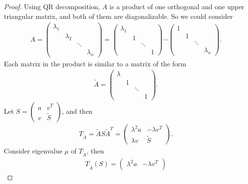 \documentclass[11pt]{book}
\theoremstyle{definition}
\numberwithin{equation}{chapter}
\begin{document}
\begin{proof}
Using QR decomposition, $A$ is a product of one orthogonal and one upper triangular matrix, and both of them are diagonalizable. So we could consider
\begin{align*}
    A = \begin{pmatrix}
        \lambda_1 & & & \\
        & \lambda_2 & & \\
        & & \ddots & \\
        & & & \lambda_n
    \end{pmatrix} = \begin{pmatrix}
        \lambda_1 & & & \\
        & 1 & & \\
        & & \ddots & \\
        & & & 1
    \end{pmatrix} \cdots \begin{pmatrix}
        1 & & & \\
        & 1 & & \\
        & & \ddots & \\
        & & & \lambda_n
    \end{pmatrix}.
\end{align*}
Each matrix in the product is similar to a matrix of the form
\begin{align*}
    \widetilde{A} = \begin{pmatrix}
        \lambda & & & \\
        & 1 & & \\
        & & \ddots & \\
        & & & 1
    \end{pmatrix}.
\end{align*}
Let $S = \begin{pmatrix}
    a & v^T \\
    v & \widetilde{S} 
\end{pmatrix}$, and then
\begin{align*}
    T_{\widetilde{A}} = \widetilde{A} S \widetilde{A}^T = \begin{pmatrix}
        \lambda^2 a & -\lambda v^T \\
        \lambda v & \widetilde{S} 
    \end{pmatrix}.
\end{align*}
Consider eigenvalue $\mu$ of $T_{\widetilde{A}}$, then
\begin{align*}
    T_{\widetilde{A}}(S) = \begin{pmatrix}
        \lambda^2 a & -\lambda v^T \\

\end{pmatrix}
\end{align*}
\end{proof}
\end{document}
